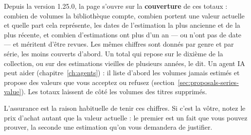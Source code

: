 Depuis la version 1.25.0, la page s'ouvre sur la \textbf{couverture} de
ces totaux : combien de volumes la bibliothèque compte, combien portent
une valeur actuelle et quelle part cela représente, les dates de
l'estimation la plus ancienne et de la plus récente, et combien
d'estimations ont plus d'un an --- ou n'ont pas de date --- et méritent
d'être revues. Les mêmes chiffres sont donnés par genre et par série,
les moins couverts d'abord. Un total qui repose sur le dixième de la
collection, ou sur des estimations vieilles de plusieurs années, le dit.
Un agent IA peut aider (chapitre~\ref{ch:agents}) : il liste d'abord
les volumes jamais estimés et propose des valeurs que vous acceptez ou
refusez (section~\ref{sec:proposals-series-value}). Les totaux laissent
de côté les volumes des titres supprimés.

\begin{note}
L'assurance est la raison habituelle de tenir ces chiffres. Si c'est la
vôtre, notez le prix d'achat autant que la valeur actuelle : le premier
est un fait que vous pouvez prouver, la seconde une estimation qu'on
vous demandera de justifier.
\end{note}
